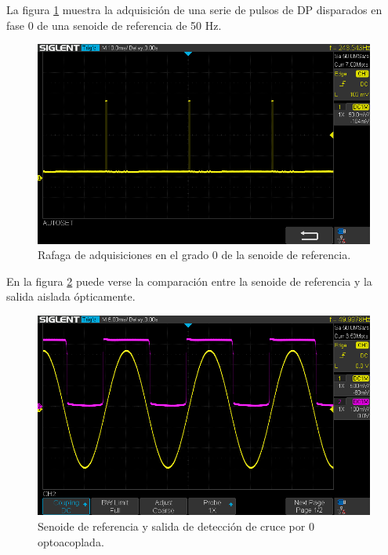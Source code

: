 La figura \ref{fig:rafagaCero} muestra la adquisición de una serie de pulsos de DP disparados en fase 0 de una senoide de referencia de 50 Hz.

\vspace{5mm}

\begin{figure}[ht]
	\centering
	\includegraphics[width=133mm]{./Figures/rafagaCero.png}
	\caption{Rafaga de adquisiciones en el grado 0 de la senoide de referencia.}
	\label{fig:rafagaCero}
\end{figure}

\vspace{5mm}

En la figura \ref{fig:zeroCross} puede verse la comparación entre la senoide de referencia y la salida aislada ópticamente.

\vspace{5mm}

\begin{figure}[ht]
	\centering
	\includegraphics[width=133mm]{./Figures/zeroCross.png}
	\caption{Senoide de referencia y salida de detección de cruce por 0 optoacoplada.}
	\label{fig:zeroCross}
\end{figure}

